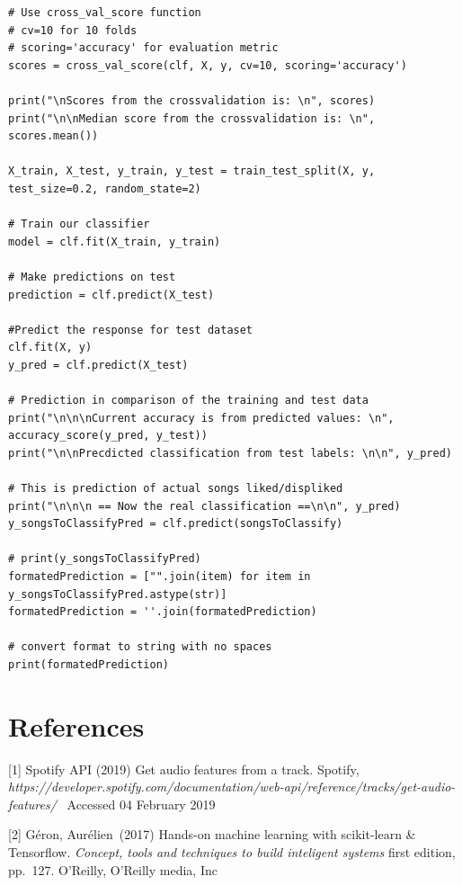\documentclass{article}
\begin{document}
\begin{verbatim}
# Use cross_val_score function
# cv=10 for 10 folds
# scoring='accuracy' for evaluation metric
scores = cross_val_score(clf, X, y, cv=10, scoring='accuracy')

print("\nScores from the crossvalidation is: \n", scores)
print("\n\nMedian score from the crossvalidation is: \n", scores.mean())

X_train, X_test, y_train, y_test = train_test_split(X, y, test_size=0.2, random_state=2)

# Train our classifier
model = clf.fit(X_train, y_train)

# Make predictions on test
prediction = clf.predict(X_test)

#Predict the response for test dataset
clf.fit(X, y)
y_pred = clf.predict(X_test)

# Prediction in comparison of the training and test data
print("\n\n\nCurrent accuracy is from predicted values: \n", accuracy_score(y_pred, y_test))
print("\n\nPrecdicted classification from test labels: \n\n", y_pred)

# This is prediction of actual songs liked/displiked
print("\n\n\n == Now the real classification ==\n\n", y_pred)
y_songsToClassifyPred = clf.predict(songsToClassify)

# print(y_songsToClassifyPred)
formatedPrediction = ["".join(item) for item in y_songsToClassifyPred.astype(str)]
formatedPrediction = ''.join(formatedPrediction)

# convert format to string with no spaces
print(formatedPrediction)
\end{verbatim}











\newpage

\section*{References}
\small

[1] Spotify API (2019) Get audio features from a track. Spotify, {\it https://developer.spotify.com/documentation/web-api/reference/tracks/get-audio-features/} \ Accessed 04 February 2019

[2] Géron, Aurélien\ (2017) Hands-on machine learning with scikit-learn & Tensorflow.
{\it Concept, tools and techniques to build inteligent systems} first edition, pp.\ 127. O'Reilly, O'Reilly media, Inc
\end{document}

